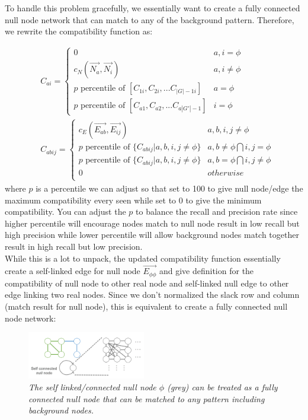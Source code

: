 To handle this problem gracefully, we essentially want to create a fully connected null node network that can match to any of the background pattern. Therefore, we rewrite the compatibility function as:

\begin{align} 
& C_{ai}  = \begin{cases}
0 & a,i=\phi \\
c_N(\overrightarrow{N_{a}},\overrightarrow{N_{i}}) & a, i\neq\phi \\
p \text{ percentile of }[C_{1i}, C_{2i},...C_{|G|-1i}] & a=\phi\\
p \text{ percentile of }[C_{a1}, C_{a2},...C_{a|G'|-1}] & i=\phi
\end{cases}\\
& C_{abij} = \begin{cases}
c_E(\overrightarrow{E_{ab}},\overrightarrow{E_{ij}})  & a,b,i,j\neq\phi \\
p \text{ percentile of }\{C_{abij}|a,b,i,j\neq\phi\} & a,b\neq\phi \bigcap i,j=\phi\\
p \text{ percentile of }\{C_{abij}|a,b,i,j\neq\phi\} & a,b=\phi \bigcap i,j\neq\phi\\
0 & otherwise\\
\end{cases}
\end{align}
where $p$ is a percentile we can adjust so that set to 100 to give null node/edge the maximum compatibility every seen while set to 0 to give the minimum compatibility. You can adjust the $p$ to balance the recall and precision rate since higher percentile will encourage nodes match to null node result in low recall but high precision while lower percentile will allow background nodes match together result in high recall but low precision.\\

While this is a lot to unpack, the updated compatibility function essentially create a self-linked edge for null node $\overrightarrow{E_{\phi\phi}}$ and give definition for the compatibility of null node to other real node and self-linked null edge to other edge linking two real nodes. Since we don't normalized the slack row and column (match result for null node), this is equivalent to create a fully connected null node network:

\begin{figure}[h]
	\centering
	\captionsetup{justification=centering}
	\includegraphics[width=0.46\textwidth]{figs/null_node_network.png}
	\caption[Caption for LOF]{\emph{The self linked/connected null node $\phi$ (grey) can be treated as a fully connected null node that can be matched to any pattern including background nodes. }}
	\label{fig:null_node_network}
\end{figure}

